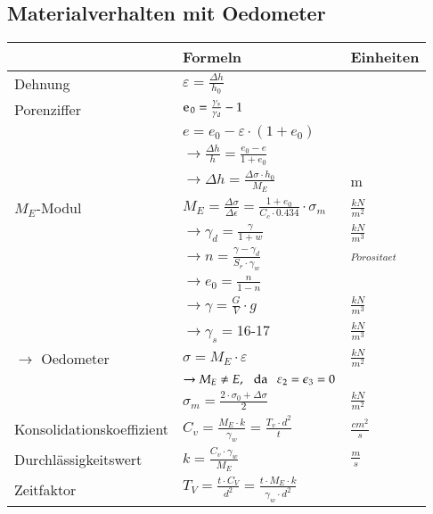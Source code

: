 \begin{minipage}[t]{0.5\linewidth}
	\subsection{Materialverhalten mit Oedometer}

	\begin{tabular}{l|l|l}
				& Formeln 									& Einheiten \\ \hline \hline
	
		Dehnung &$\varepsilon = \frac{\Delta h}{h_0}$& \\ \hline
	
		Porenziffer&$\e_0=\frac{\gamma_s}{\gamma_d} -1$		& \\
				&$e=e_0-\varepsilon \cdot \left(1+ e_0\right)$	&\\
				&$\rightarrow\frac{\Delta h}{h}=\frac{e_0 - e}{1+e_0}$&\\	
				&$\rightarrow\Delta h=\frac{\Delta \sigma \cdot h_0}{M_E}$&m \\ \hline
	
		$M_E$-Modul&$M_E=\frac{\Delta \sigma}{\Delta \epsilon}=\frac{1+e_0}{C_c \cdot 0.434}\cdot\sigma_m$&$\frac{kN}{m^2}$ \\	
				&$\rightarrow \gamma_d=\frac{\gamma}{1+w}$	&$\frac{kN}{m^3}$ \\
				&$\rightarrow n=\frac{\gamma-\gamma_d}{S_r\cdot\gamma_w}$&  $_{Porositaet}$ \\
				&$\rightarrow e_0=\frac{n}{1-n}$			& \\
				&$\rightarrow \gamma=\frac{G}{V}\cdot g$	& $\frac{kN}{m^3}$ \\
				&$\rightarrow \gamma_s=$16-17				& $\frac{kN}{m^3}$ \\ \hline

		$\rightarrow$ Oedometer&$\sigma=M_E \cdot \varepsilon$ &$\frac{kN}{m^2}$ \\
				&$\rightarrow M_E\neq E, \hspace{0.25cm}\text{da} \hspace{.25cm} \varepsilon_2=\epsilon_3=0$& \\
				&$\sigma_m=\frac{2\cdot\sigma_0+\Delta \sigma}{2}$&$\frac{kN}{m^2}$ \\ \hline

		Konsolidationskoeffizient&$C_v=\frac{M_E\cdot k}{\gamma_w}=\frac{T_v\cdot d^2}{t}$&$\frac{cm^2}{s}$ \\ \hline

		Durchlässigkeitswert&$k=\frac{C_v\cdot\gamma_w}{M_E}$& $\frac{m}{s}$ \\ \hline
		Zeitfaktor&$T_V=\frac{t\cdot C_V}{d^2}=\frac{t\cdot M_E\cdot k}{\gamma_w\cdot d^2}$& \\ \hline
	

\end{tabular}
\end{minipage}
